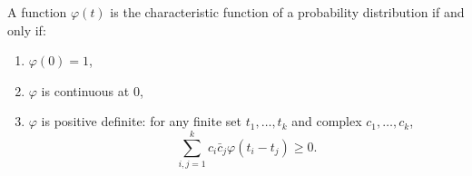 A function $\varphi(t)$ is the characteristic function of a probability distribution if and only if:
\begin{enumerate}
\item $\varphi(0) = 1$,
\item $\varphi$ is continuous at $0$,
\item $\varphi$ is positive definite: for any finite set $t_1, \ldots, t_k$ and complex $c_1, \ldots, c_k$,
  $$\sum_{i,j=1}^{k} c_i \bar{c}_j \varphi(t_i - t_j) \geq 0.$$
\end{enumerate}
